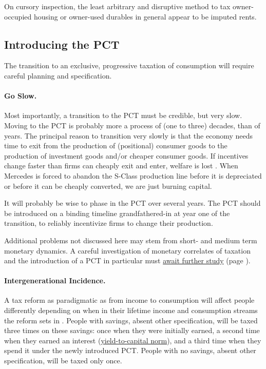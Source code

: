 On cursory inspection, the least arbitrary and disruptive method to tax owner-occupied housing or owner-used durables in general appear to be imputed rents.

\subsection{Introducing the PCT}
The transition to an exclusive, progressive taxation of consumption will require careful planning and specification.

\paragraph{Go Slow.}
	\label{sec:GoSlow}
Most importantly, a transition to the PCT must be credible, but very slow.
Moving to the PCT is probably more a process of (one to three) decades, than of years.
The principal reason to transition very slowly is that the economy needs time to exit from the production of (positional) consumer goods to the production of investment goods and/or cheaper consumer goods.
If incentives change faster than firms can cheaply exit and enter, welfare is lost \citep[20]{Seidman1997}.
When Mercedes is forced to abandon the S-Class production line before it is depreciated or before it can be cheaply converted, we are just burning capital.

It will probably be wise to phase in the PCT over several years.
The PCT should be introduced on a binding timeline grandfathered-in at year one of the transition, to reliably incentivize firms to change their production.

Additional problems not discussed here may stem from short- and medium term monetary dynamics.
A careful investigation of monetary correlates of taxation and the introduction of a PCT in particular must \hyperref[sec:LooseEnds]{await further study} (page \pageref{sec:LooseEnds}).

\paragraph{Intergenerational Incidence.}
	\label{sec:IntergenerationalIncidence}
A tax reform as paradigmatic as from income to consumption will affect people differently depending on when in their lifetime income and consumption streams the reform sets in \citep[1649]{Graetz2009}.
People with savings, absent other specification, will be taxed three times on these savings:
once when they were initially earned, a second time when they earned an interest (\hyperref[sec:Y2C]{yield-to-capital norm}), and a third time when they spend it under the newly introduced PCT.
People with no savings, absent other specification, will be taxed only once.

